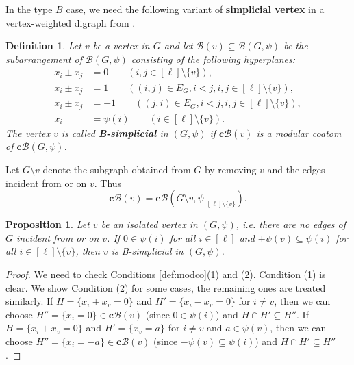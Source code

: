 \documentclass[11pt]{article}
\newtheorem{proposition}[theo]{Proposition}
\newtheorem{definition}[theo]{Definition}
\theoremstyle{definition}
\numberwithin{equation}{section}
\newcommand{\B}{\mathcal{B}}
\newcommand{\cc}{\mathbf{c}}
\newcommand{\tbf}{\textbf}
\begin{document}
In the type $B$ case, we need the following variant of \tbf{simplicial vertex} in a vertex-weighted digraph from \cite[Definition 3.10]{ATT24}. 

\begin{definition}
\label{def:B-simplicial}
Let $v$ be a vertex in $G$ and let $\B(v) \subseteq \mathcal{B}(G,\psi)$ be the subarrangement of $\mathcal{B}(G,\psi)$ consisting of the following hyperplanes:
\begin{align*}
x_{i}\pm x_{j} &= 0 \qquad (i,j\in [\ell]\setminus\{v\}), \\
x_{i}\pm x_{j} &= 1\qquad ((i,j) \in E_{G},i<j,  i,j\in [\ell]\setminus\{v\}), \\
x_{i}\pm x_{j} &= -1 \qquad ((j,i) \in E_{G},i<j,  i,j\in [\ell]\setminus\{v\}), \\
 x_{i} &= \psi(i) \qquad (i\in [\ell]\setminus\{v\}). 
\end{align*}
The vertex $ v $ is called \textbf{B-simplicial} in $ (G,\psi) $ if $\cc\B(v)$ is a modular coatom of $ \mathbf{c}\mathcal{B}(G,\psi) $.
\end{definition}

Let  $ G\setminus v $ denote the subgraph obtained from $G$ by removing $ v $ and the edges incident from or on $v$.  
Thus 
$$\cc\B(v)=\mathbf{c}\B\left(G\setminus v, \psi|_{[\ell]\setminus\{v\}}\right) .$$ 

\begin{proposition}
 \label{prop:isolated}
 Let  $ v $ be an isolated vertex in $(G,\psi)$, i.e. there are no edges of $G$ incident from or on $v$. 
If $0 \in \psi(i) $ for all $ i \in [\ell] $ and $ \pm\psi(v) \subseteq \psi(i) $ for all $ i\in [\ell]\setminus\{v\}$, then $ v $ is B-simplicial in $ (G,\psi) $. 
\end{proposition}
\begin{proof}
We need to check Conditions \ref{def:modco}(1) and (2). 
Condition (1) is clear. 
We show Condition (2) for some cases, the remaining ones are treated similarly. 
If $H=\{x_i +x_v =0\}$ and $H'=\{x_i -x_v =0\}$ for $i\ne v$, then we can choose $H'' = \{x_i =0\} \in \cc\B(v)$ (since  $0 \in \psi(i) $) and $ H\cap H'\subseteq H''$.  
If $H=\{x_i +x_v =0\}$ and $H'=\{x_v =a\}$ for $i\ne v$ and $a \in \psi(v)$, then we can choose $H'' = \{x_i =-a\} \in \cc\B(v)$ (since  $-\psi(v) \subseteq \psi(i)  $) and $ H\cap H'\subseteq H''$.
\end{proof}
\end{document}
